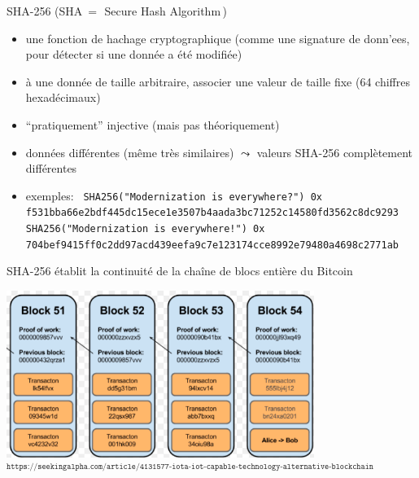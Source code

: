 
\begin{frame}{\LARGE SHA-256 \normalsize(SHA \,=\, \guillemotleft\,Secure Hash Algorithm\,\guillemotright)}

\normalsize

\begin{itemize}
\item
	une fonction de hachage cryptographique
	\vskip -0.1cm
	{\scriptsize(comme une {\color{red}signature} de donn'ees, pour d\'etecter si une donn\'ee a \'et\'e modifi\'ee)}

\vskip 0.3cm
\item
	\`a une donn\'ee de taille arbitraire, associer une valeur de taille fixe (64 chiffres hexad\'ecimaux)

\vskip 0.3cm
\item
	``pratiquement'' injective (mais pas th\'eoriquement)

\vskip 0.3cm
\item
	donn\'ees diff\'erentes (m\^eme tr\`es similaires) \;$\leadsto$\; valeurs SHA-256 compl\`etement diff\'erentes

\vskip 0.3cm
\item
	exemples:
	\vskip 0.18cm{\tt\tiny
	{\footnotesize SHA256("Modernization is everywhere{\color{red}?}")}
	\vskip 0.02cm
	0x f531bba66e2bdf445dc15ece1e3507b4aada3bc71252c14580fd3562c8dc9293
	\vskip 0.3cm
	{\footnotesize SHA256("Modernization is everywhere{\color{red}!}")}
	\vskip -0.21cm
	0x 704bef9415ff0c2dd97acd439eefa9c7e123174cce8992e79480a4698c2771ab}
\end{itemize}

\end{frame}
\normalsize


\begin{frame}{\Large SHA-256 \'etablit la continuit\'e de la cha\^ine de blocs enti\`ere du Bitcoin}

\begin{center}
\includegraphics[width=10cm]{graphics/bitcoin-blockchain.png}
\vskip 0.1cm
{\tiny$^{\texttt{https://seekingalpha.com/article/4131577-iota-iot-capable-technology-alternative-blockchain}}$}
\end{center}

\end{frame}
\normalsize

